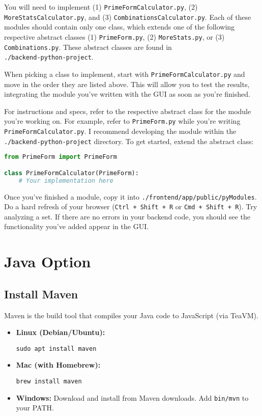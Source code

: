 \documentclass[11pt,letterpaper]{article}
\newcommand{\code}[1]{\texttt{\small #1}}
\begin{document}
You will need to implement (1) \code{PrimeFormCalculator.py}, (2) \code{MoreStatsCalculator.py}, and (3) \code{CombinationsCalculator.py}. Each of these modules should contain only one class, which extends one of the following respective abstract classes (1) \code{PrimeForm.py}, (2) \code{MoreStats.py}, or (3) \code{Combinations.py}. These abstract classes are found in \\
\code{./backend-python-project}.

\begin{importantbox}
When picking a class to implement, start with \code{PrimeFormCalculator.py} and move in the order they are listed above. This will allow you to test the results, integrating the module you've written with the GUI as soon as you're finished.
\end{importantbox}

For instructions and specs, refer to the respective abstract class for the module you're working on. For example, refer to \code{PrimeForm.py} while you're writing \\
\code{PrimeFormCalculator.py}. I recommend developing the module within the \\ \code{./backend-python-project} directory. To get started, extend the abstract class:

\begin{lstlisting}[language=Python]
from PrimeForm import PrimeForm

class PrimeFormCalculator(PrimeForm):
    # Your implementation here
\end{lstlisting}

Once you've finished a module, copy it into \code{./frontend/app/public/pyModules}. Do a hard refresh of your browser (\texttt{Ctrl + Shift + R} or \texttt{Cmd + Shift + R}). Try analyzing a set. If there are no errors in your backend code, you should see the functionality you've added appear in the GUI.

\section{Java Option}

\subsection{Install Maven}
Maven is the build tool that compiles your Java code to JavaScript (via TeaVM).

\begin{itemize}[leftmargin=*]
    \item \textbf{Linux (Debian/Ubuntu):}
    \begin{lstlisting}
sudo apt install maven
    \end{lstlisting}
    
    \item \textbf{Mac (with Homebrew):}
    \begin{lstlisting}
brew install maven
    \end{lstlisting}
    
    \item \textbf{Windows:} Download and install from Maven downloads. Add \code{bin/mvn} to your PATH.
\end{itemize}
\end{document}
